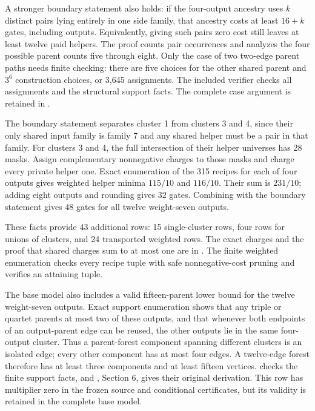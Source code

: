 A stronger boundary statement also holds: if the four-output ancestry uses \(k\) distinct pairs lying entirely in one side family, that ancestry costs at least \(16+k\) gates, including outputs. Equivalently, giving such pairs zero cost still leaves at least twelve paid helpers. The proof counts pair occurrences and analyzes the four possible parent counts five through eight. Only the case of two two-edge parent paths needs finite checking: there are five choices for the other shared parent and \(3^6\) construction choices, or 3,645 assignments. The included verifier checks all assignments and the structural support facts. The complete case argument is retained in \texttt{}.

The boundary statement separates cluster 1 from clusters 3 and 4, since their only shared input family is family 7 and any shared helper must be a pair in that family. For clusters 3 and 4, the full intersection of their helper universes has 28 masks. Assign complementary nonnegative charges to those masks and charge every private helper one. Exact enumeration of the 315 recipes for each of four outputs gives weighted helper minima \(115/10\) and \(116/10\). Their sum is \(231/10\); adding eight outputs and rounding gives 32 gates. Combining with the boundary statement gives 48 gates for all twelve weight-seven outputs.

These facts provide 43 additional rows: 15 single-cluster rows, four rows for unions of clusters, and 24 transported weighted rows. The exact charges and the proof that shared charges sum to at most one are in \texttt{}. The finite weighted enumeration checks every recipe tuple with safe nonnegative-cost pruning and verifies an attaining tuple.

The base model also includes a valid fifteen-parent lower bound for the twelve weight-seven outputs. Exact support enumeration shows that any triple or quartet parents at most two of these outputs, and that whenever both endpoints of an output-parent edge can be reused, the other outputs lie in the same four-output cluster. Thus a parent-forest component spanning different clusters is an isolated edge; every other component has at most four edges. A twelve-edge forest therefore has at least three components and at least fifteen vertices. \texttt{} checks the finite support facts, and \texttt{}, Section 6, gives their original derivation. This row has multiplier zero in the frozen source and conditional certificates, but its validity is retained in the complete base model.

